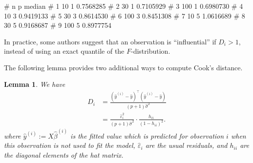\documentclass[
  a4paper,
]{article}
\newenvironment{Shaded}{\begin{snugshade}}{\end{snugshade}}
\newcommand{\AttributeTok}[1]{\textcolor[rgb]{0.77,0.63,0.00}{#1}}
\newcommand{\DecValTok}[1]{\textcolor[rgb]{0.00,0.00,0.81}{#1}}
\newcommand{\FloatTok}[1]{\textcolor[rgb]{0.00,0.00,0.81}{#1}}
\newcommand{\FunctionTok}[1]{\textcolor[rgb]{0.00,0.00,0.00}{#1}}
\newcommand{\NormalTok}[1]{#1}
\newcommand{\OtherTok}[1]{\textcolor[rgb]{0.56,0.35,0.01}{#1}}
\newcommand{\SpecialCharTok}[1]{\textcolor[rgb]{0.00,0.00,0.00}{#1}}
\newtheorem{lemma}{Lemma}[section]
\theoremstyle{definition}
\theoremstyle{definition}
\theoremstyle{definition}
\theoremstyle{definition}
\theoremstyle{remark}
\begin{document}
\begin{Shaded}
\end{Shaded}

\begin{Shaded}
\begin{Highlighting}[]
\NormalTok{\#     n p    median}
\NormalTok{\# 1  10 1 0.7568285}
\NormalTok{\# 2  30 1 0.7105929}
\NormalTok{\# 3 100 1 0.6980730}
\NormalTok{\# 4  10 3 0.9419133}
\NormalTok{\# 5  30 3 0.8614530}
\NormalTok{\# 6 100 3 0.8451308}
\NormalTok{\# 7  10 5 1.0616689}
\NormalTok{\# 8  30 5 0.9168687}
\NormalTok{\# 9 100 5 0.8977754}
\end{Highlighting}
\end{Shaded}

In practice, some authors suggest that an observation is ``influential''
if \(D_i > 1\), instead of using an exact quantile of the \(F\)-distribution.

The following lemma provides two additional ways to compute Cook's
distance.

\begin{lemma}
\protect\hypertarget{lem:Cook-D-alt}{}\label{lem:Cook-D-alt}We have
\begin{align*}
  D_i
  &= \frac{(\hat y^{(i)} - \hat y)^\top (\hat y^{(i)} - \hat y)}{(p+1)\hat\sigma^2} \\
  &= \frac{\hat\varepsilon_i^2}{(p+1)\hat\sigma^2} \cdot \frac{h_{ii}}{(1-h_{ii})^2}.
\end{align*}
where \(\hat y^{(i)} := X \hat\beta^{(i)}\) is the fitted value which is
predicted for observation \(i\) when this observation is not used to fit the
model, \(\hat\varepsilon_i\) are the usual residuals, and \(h_{ii}\) are the
diagonal elements of the hat matrix.
\end{lemma}
\end{document}
